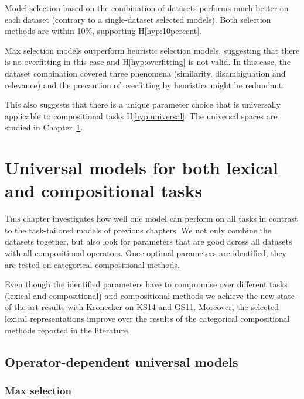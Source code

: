 Model selection based on the combination of datasets performs much better on each dataset (contrary to a single-dataset selected models). Both selection methods are within 10\%, supporting H\ref{hyp:10percent}.

Max selection models outperform heuristic selection models, suggesting that there is no overfitting in this case and H\ref{hyp:overfitting} is not valid. In this case, the dataset combination covered three phenomena (similarity, disambiguation and relevance) and the precaution of overfitting by heuristics might be redundant.

This also suggests that there is a unique parameter choice that is universally applicable to compositional tasks H\ref{hyp:universal}. The universal spaces are studied in Chapter~\ref{sec:universal-param-selection}.

\chapter[Universal models]{Universal models for both lexical and compositional tasks}
\label{sec:universal-param-selection}

\lettrine[lines=5,loversize=0.25]{T}{his} chapter investigates how well one model can perform on all tasks in contrast to the task-tailored models of previous chapters.
We not only combine the datasets together, but also look for parameters that are good across all datasets with all compositional operators. Once optimal parameters are identified, they are tested on categorical compositional methods.

Even though the identified parameters have to compromise over different tasks (lexical and compositional) and compositional methods we achieve the new state-of-the-art results with Kronecker on KS14 and GS11. Moreover, the selected lexical representations improve over the results of the categorical compositional methods reported in the literature.

\section{Operator-dependent universal models}
\label{sec:model-selection}

\subsection{Max selection}
\label{sec:max-selection-universal}

